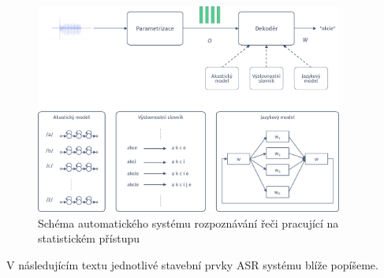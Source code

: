\begin{figure}[hbpt]
  \centering
  \includegraphics[width=0.9\textwidth]{./ch4-asr/img/decoding.pdf}
  \caption{Schéma automatického systému rozpoznávání řeči pracující na statistickém přístupu}
  \label{fig:asr:decoding}
\end{figure}

V následujícím textu jednotlivé stavební prvky ASR systému blíže popíšeme.





% 




